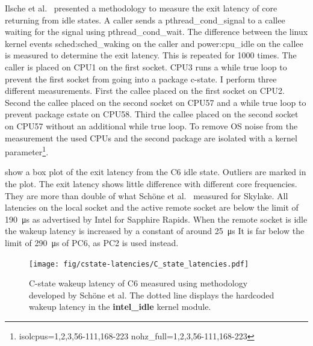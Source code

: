 Ilsche et al.~\cite{Ilsche_2018_cstate} presented a methodology to measure the exit latency of core returning from idle states.
A caller sends a pthread\_cond\_signal to a callee waiting for the signal using pthread\_cond\_wait.
The difference between the linux kernel events sched:sched\_waking on the caller and power:cpu\_idle on the callee is measured to determine the exit latency.
This is repeated for \SI{1000}{} times.
The caller is placed on CPU1 on the first socket.
CPU3 runs a while true loop to prevent the first socket from going into a package c-state.
I perform three different measurements.
First the callee placed on the first socket on CPU2.
Second the callee placed on the second socket on CPU57 and a while true loop to prevent package cstate on CPU58.
Third the callee placed on the second socket on CPU57 without an additional while true loop.
To remove OS noise from the measurement the used CPUs and the second package are isolated with a kernel parameter\footnote{isolcpus=1,2,3,56-111,168-223 nohz\_full=1,2,3,56-111,168-223}.

 show a box plot of the exit latency from the C6 idle state.
Outliers are marked in the plot.
The exit latency shows little difference with different core frequencies.
They are more than double of what Schöne et al.~\cite{Schoene_2019_SKL} measured for Skylake.
All latencies on the local socket and the active remote socket are below the limit of \SI{190}{\us} as advertised by Intel for Sapphire Rapids.
When the remote socket is idle the wakeup latency is increased by a constant of around \SI{25}{\us}
It is far below the limit of \SI{290}{\us} of PC6, as PC2 is used instead.

\begin{figure}[!ht]
    \centering
    \texttt{[image: fig/cstate-latencies/C\_state\_latencies.pdf]}
    \caption{\label{fig:c6_latencies}C-state wakeup latency of C6 measured using methodology developed by Schöne et al.
The dotted line displays the hardcoded wakeup latency in the \protect\textbf{intel\_idle} kernel module.
\protect\footnotemark}
\end{figure}
